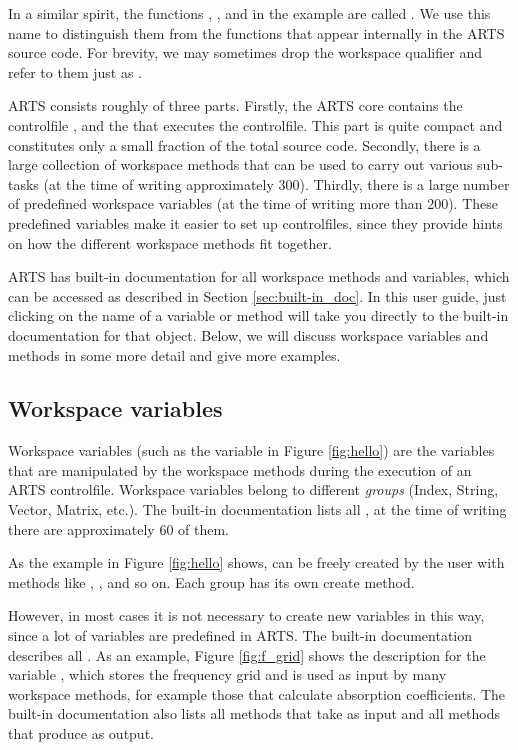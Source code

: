 In a similar spirit, the functions ,
, and  in the example are called
\emph{}. We use this name to distinguish
them from the functions that appear internally in the ARTS source
code. For brevity, we may sometimes drop the workspace qualifier and
refer to them just as .

ARTS consists roughly of three parts. Firstly, the ARTS core contains the
controlfile , and the  that executes the controlfile. This part is
quite compact and constitutes only a small fraction of the total source code.
Secondly, there is a large collection of workspace methods that can be used to
carry out various sub-tasks (at the time of writing approximately 300).
Thirdly, there is a large number of predefined workspace variables (at the time
of writing more than 200). These predefined variables make it easier to set up
controlfiles, since they provide hints on how the different workspace methods
fit together.

ARTS has built-in documentation for all workspace methods and
variables, which can be accessed as described in Section
\ref{sec:built-in_doc}.  In this user guide, just clicking on the name
of a variable or method will take you directly to the built-in
documentation for that object.  Below, we will discuss workspace
variables and methods in some more detail and give more examples.

\subsection{Workspace variables}

Workspace variables (such as the variable  in Figure
\ref{fig:hello}) are the variables that are manipulated by the
workspace methods during the execution of an ARTS
controlfile. Workspace variables belong to different \emph{groups}
(Index, String, Vector, Matrix, etc.). The built-in documentation
lists all , at the time of writing there are
approximately 60 of them.

As the example in Figure \ref{fig:hello} shows,  can be freely created by the user with methods like
, , and so on.
Each group has its own create method.

However, in most cases it is not necessary to create new variables in
this way, since a lot of variables are predefined in ARTS. The
built-in documentation describes all . As an example, Figure \ref{fig:f_grid} shows the
description for the variable , which stores the
frequency grid and is used as input by many workspace methods, for
example those that calculate absorption coefficients. The built-in
documentation also lists all methods that take  as
input and all methods that produce  as output.


